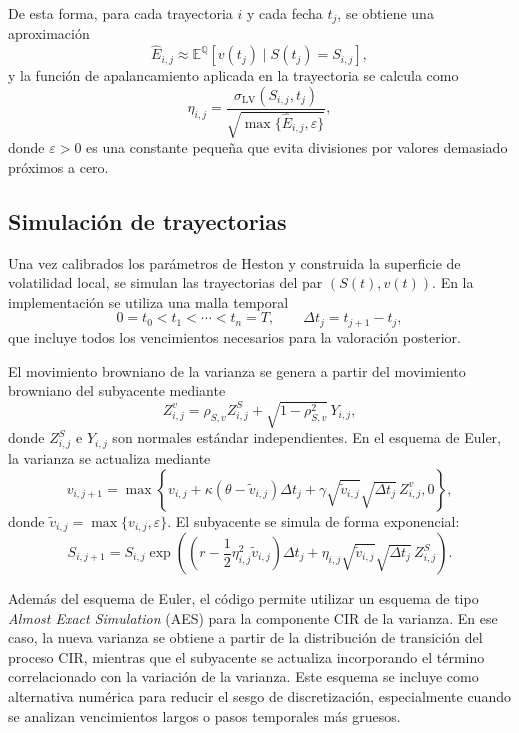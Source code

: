 De esta forma, para cada trayectoria \(i\) y cada fecha \(t_j\), se obtiene una aproximación
\[
\widehat{E}_{i,j}
\approx
\mathbb{E}^{\mathbb{Q}}[v(t_j)\mid S(t_j)=S_{i,j}],
\]
y la función de apalancamiento aplicada en la trayectoria se calcula como
\begin{equation}
\label{eq:impl_slv_leverage}
\eta_{i,j}
=
\frac{\sigma_{\mathrm{LV}}(S_{i,j},t_j)}
{\sqrt{\max\{\widehat{E}_{i,j},\varepsilon\}}},
\end{equation}
donde \(\varepsilon>0\) es una constante pequeña que evita divisiones por valores demasiado próximos a cero.

\subsection{Simulación de trayectorias}

Una vez calibrados los parámetros de Heston y construida la superficie de volatilidad local, se simulan las trayectorias del par \((S(t),v(t))\). En la implementación se utiliza una malla temporal
\[
0=t_0<t_1<\cdots<t_n=T,
\qquad
\Delta t_j=t_{j+1}-t_j,
\]
que incluye todos los vencimientos necesarios para la valoración posterior.\medskip

El movimiento browniano de la varianza se genera a partir del movimiento browniano del subyacente mediante
\[
Z^v_{i,j}
=
\rho_{S,v} Z^S_{i,j}
+
\sqrt{1-\rho_{S,v}^2}\,Y_{i,j},
\]
donde \(Z^S_{i,j}\) e \(Y_{i,j}\) son normales estándar independientes. En el esquema de Euler, la varianza se actualiza mediante
\begin{equation}
\label{eq:impl_slv_var_euler}
v_{i,j+1}
=
\max\left\{
v_{i,j}
+
\kappa(\theta-\widetilde v_{i,j})\Delta t_j
+
\gamma\sqrt{\widetilde v_{i,j}}\sqrt{\Delta t_j}\,Z^v_{i,j},
0
\right\},
\end{equation}
donde \(\widetilde v_{i,j}=\max\{v_{i,j},\varepsilon\}\). El subyacente se simula de forma exponencial:
\begin{equation}
\label{eq:impl_slv_spot_euler}
S_{i,j+1}
=
S_{i,j}
\exp\left(
\left(r-\frac{1}{2}\eta_{i,j}^2\widetilde v_{i,j}\right)\Delta t_j
+
\eta_{i,j}\sqrt{\widetilde v_{i,j}}\sqrt{\Delta t_j}\,Z^S_{i,j}
\right).
\end{equation}

Además del esquema de Euler, el código permite utilizar un esquema de tipo \textit{Almost Exact Simulation} (AES) para la componente CIR de la varianza. En ese caso, la nueva varianza se obtiene a partir de la distribución de transición del proceso CIR, mientras que el subyacente se actualiza incorporando el término correlacionado con la variación de la varianza. Este esquema se incluye como alternativa numérica para reducir el sesgo de discretización, especialmente cuando se analizan vencimientos largos o pasos temporales más gruesos.\medskip

